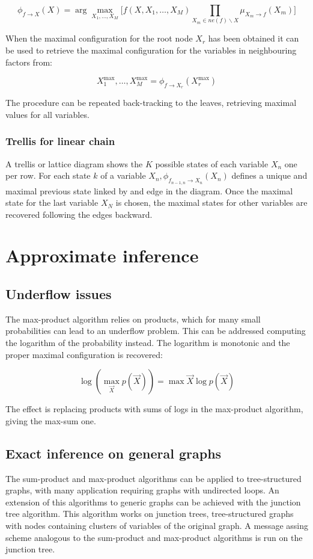 		$$\phi_{f\rightarrow X}(X) = \arg\max\limits_{X_1,\dots,X_M}\biggl[f(X, X_1, \dots, X_M)\prod\limits_{X_m\in ne(f)\backslash X} \mu_{X_m\rightarrow f}(X_m)\biggr]$$

		When the maximal configuration for the root node $X_r$ has been obtained it can be used to retrieve the maximal configuration for the variables in neighbouring factors from:

		$$X_1^{\max}, \dots, X_M^{\max} = \phi_{f\rightarrow X_r}(X_r^{\max})$$

		The procedure can be repeated back-tracking to the leaves, retrieving maximal values for all variables.

		\subsubsection{Trellis for linear chain}
		A trellis or lattice diagram shows the $K$ possible states of each variable $X_n$ one per row.
		For each state $k$ of a variable $X_n, \phi_{f_{n-1,n}\rightarrow X_n}(X_n)$ defines a unique and maximal previous state linked by and edge in the diagram.
		Once the maximal state for the last variable $X_N$ is chosen, the maximal states for other variables are recovered following the edges backward.

\section{Approximate inference}

	\subsection{Underflow issues}
	The max-product algorithm relies on products, which for many small probabilities can lead to an underflow problem.
	This can be addressed computing the logarithm of the probability instead.
	The logarithm is monotonic and the proper maximal configuration is recovered:

	$$\log(\max\limits_{\vec{X}}p(\vec{X})) = \max\limits{\vec{X}}\log p(\vec{X})$$

	The effect is replacing products with sums of logs in the max-product algorithm, giving the max-sum one.

	\subsection{Exact inference on general graphs}
	The sum-product and max-product algorithms can be applied to tree-structured graphs, with many application requiring graphs with undirected loops.
	An extension of this algorithms to generic graphs can be achieved with the junction tree algorithm.
	This algorithm works on junction trees, tree-structured graphs with nodes containing clusters of variables of the original graph.
	A message assing scheme analogous to the sum-product and max-product algorithms is run on the junction tree.

